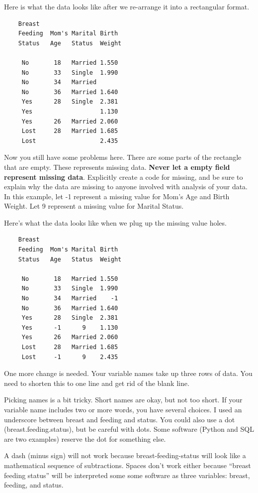 \documentclass[
  letterpaper,
  DIV=11,
  numbers=noendperiod]{scrreprt}
\begin{document}
Here is what the data looks like after we re-arrange it into a
rectangular format.

\begin{verbatim}
    Breast
    Feeding  Mom's Marital Birth
    Status   Age   Status  Weight

     No       18   Married 1.550
     No       33   Single  1.990
     No       34   Married      
     No       36   Married 1.640
     Yes      28   Single  2.381
     Yes                   1.130
     Yes      26   Married 2.060
     Lost     28   Married 1.685
     Lost                  2.435
\end{verbatim}

Now you still have some problems here. There are some parts of the
rectangle that are empty. These represents missing data. \textbf{Never
let a empty field represent missing data}. Explicitly create a code for
missing, and be sure to explain why the data are missing to anyone
involved with analysis of your data. In this example, let -1 represent a
missing value for Mom's Age and Birth Weight. Let 9 represent a missing
value for Marital Status.

Here's what the data looks like when we plug up the missing value holes.

\begin{verbatim}
    Breast
    Feeding  Mom's Marital Birth
    Status   Age   Status  Weight

     No       18   Married 1.550
     No       33   Single  1.990
     No       34   Married    -1
     No       36   Married 1.640
     Yes      28   Single  2.381
     Yes      -1      9    1.130
     Yes      26   Married 2.060
     Lost     28   Married 1.685
     Lost     -1      9    2.435
\end{verbatim}

One more change is needed. Your variable names take up three rows of
data. You need to shorten this to one line and get rid of the blank
line.

Picking names is a bit tricky. Short names are okay, but not too short.
If your variable name includes two or more words, you have several
choices. I used an underscore between breast and feeding and status. You
could also use a dot (breast.feeding.status), but be careful with dots.
Some software (Python and SQL are two examples) reserve the dot for
something else.

A dash (minus sign) will not work because breast-feeding-status will
look like a mathematical sequence of subtractions. Spaces don't work
either because ``breast feeding status'' will be interpreted some some
software as three variables: breast, feeding, and status.
\end{document}
